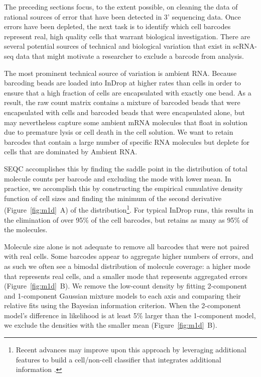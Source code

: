 The preceding sections focus, to the extent possible,  on cleaning the data of rational sources of error that have been detected in 3' sequencing data. 
Once errors have been depleted, the next task is to identify which cell barcodes represent real, high quality cells that warrant biological investigation. 
There are several potential sources of technical and biological variation that exist in scRNA-seq data that might motivate a researcher to exclude a barcode from analysis. 

The most prominent technical source of variation is ambient RNA\@. 
Because barcoding beads are loaded into InDrop at higher rates than cells in order to ensure that a high fraction of cells are encapsulated with exactly one bead. 
As a result, the raw count matrix contains a mixture of barcoded beads that were encapsulated with cells and barcoded beads that were encapsulated alone, but may nevertheless capture some ambient mRNA molecules that float in solution due to premature lysis or cell death in the cell solution. 
We want to retain barcodes that contain a large number of specific RNA molecules but deplete for cells that are dominated by Ambient RNA\@. 

SEQC accomplishes this by finding the saddle point in the distribution of total molecule counts per barcode and excluding the mode with lower mean. 
In practice, we accomplish this by constructing the empirical cumulative density function of cell sizes and finding the minimum of the second derivative (Figure~\ref{fig:m1d}~A) of the distribution\footnote{Recent advances may improve upon this approach by leveraging additional features to build a cell/non-cell classifier that integrates additional information \citep{Petukhov2017}.}.
For typical InDrop runs, this results in the elimination of over 95\% of the cell barcodes, but retains as many as 95\% of the molecules.

Molecule size alone is not adequate to remove all barcodes that were not paired with real cells. 
Some barcodes appear to aggregate higher numbers of errors, and as such we often see a bimodal distribution of molecule coverage: a higher mode that represents real cells, and a smaller mode that represents aggregated errors (Figure~\ref{fig:m1d}~B). 
We remove the low-count density by fitting 2-component and 1-component Gaussian mixture models to each axis and comparing their relative fits using the Bayesian information criterion. 
When the 2-component model's difference in likelihood is at least 5\% larger than the 1-component model, we exclude the densities with the smaller mean (Figure~\ref{fig:m1d}~B).

